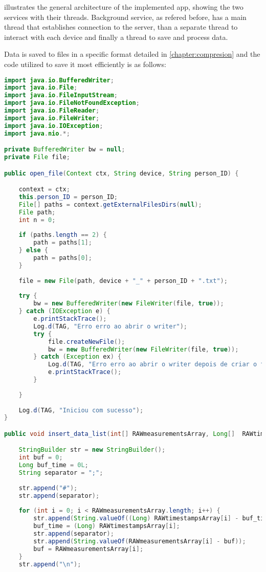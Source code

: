  illustrates the general architecture of the implemented app, showing the two services with their threads. Background service, as refered before, has a main thread that establishes connection to the server, than a separate thread to interact with each device and finally a thread to save and process data. 


Data is saved to files in a specific format detailed in \cref{chapter:compresion} and the code utilized to save it most efficiently is as follows:

\bigskip
\begin{lstlisting}[language=Java]
import java.io.BufferedWriter;
import java.io.File;
import java.io.FileInputStream;
import java.io.FileNotFoundException;
import java.io.FileReader;
import java.io.FileWriter;
import java.io.IOException;
import java.nio.*;

private BufferedWriter bw = null;
private File file;

public open_file(Context ctx, String device, String person_ID) {

	context = ctx;
	this.person_ID = person_ID;
	File[] paths = context.getExternalFilesDirs(null);
	File path;
	int n = 0;
	
	if (paths.length == 2) {
		path = paths[1];
	} else {
		path = paths[0];
	}
	
	file = new File(path, device + "_" + person_ID + ".txt");
	
	try {
		bw = new BufferedWriter(new FileWriter(file, true));
	} catch (IOException e) {
		e.printStackTrace();
		Log.d(TAG, "Erro erro ao abrir o writer");
		try {
			file.createNewFile();
			bw = new BufferedWriter(new FileWriter(file, true));
		} catch (Exception ex) {
			Log.d(TAG, "Erro erro ao abrir o writer depois de criar o ficheiro");
			e.printStackTrace();
		}
	
	}
	
	Log.d(TAG, "Iniciou com sucesso");
}

public void insert_data_list(int[] RAWmeasurementsArray, Long[]  RAWtimestampsArray) {

	StringBuilder str = new StringBuilder();
	int buf = 0;
	Long buf_time = 0L;
	String separator = ";";
	
	str.append("#");
	str.append(separator);
	
	for (int i = 0; i < RAWmeasurementsArray.length; i++) {
		str.append(String.valueOf((Long) RAWtimestampsArray[i] - buf_time));
		buf_time = (Long) RAWtimestampsArray[i];	
		str.append(separator);
		str.append(String.valueOf(RAWmeasurementsArray[i] - buf));
		buf = RAWmeasurementsArray[i];
	}
	str.append("\n");
	

\end{lstlisting}
